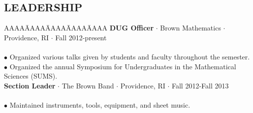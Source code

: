 \documentclass{res}
\begin{document}
\begin{resume}
\section{LEADERSHIP}
\myvspace
\begin{tabbing}
   AAAA\=AAAA\=AAAA\=AAAA\=AAAA\kill
{\bf DUG Officer} $\cdot$ Brown Mathematics $\cdot$ Providence, RI $\cdot$ Fall 2012-present\\
	\\
	\>$\bullet$ Organized various talks given by students and faculty throughout the semester. \\
	\>$\bullet$ Organized the annual Symposium for Undergraduates in the Mathematical Sciences (SUMS).\\
\sbreak
{\bf Section Leader} $\cdot$ The Brown Band $\cdot$ Providence, RI $\cdot$ Fall 2012-Fall 2013\\
	\\
	\>$\bullet$ Maintained instruments, tools, equipment, and sheet music.\\ 

\end{tabbing}
\end{resume}
\end{document}
